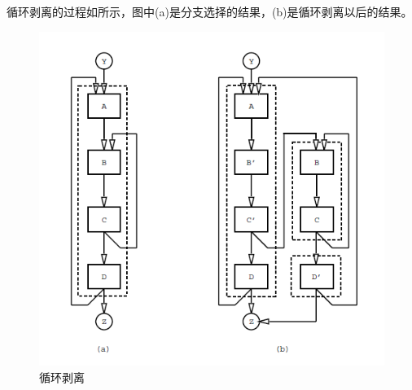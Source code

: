 循环剥离的过程如所示，图中(a)是分支选择的结果，(b)是循环剥离以后的结果。
\begin{figure}
\includegraphics[width=\linewidth]{mechanism/hyperblock-lp}
\caption{\label{fig:looppeeling} 循环剥离}
\end{figure}
